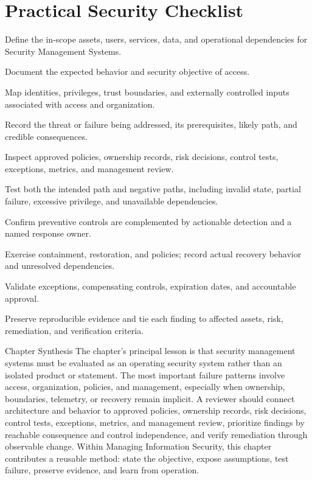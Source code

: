 \documentclass[11pt,letterpaper]{article}
\begin{document}
\section*{Practical Security Checklist}
\begin{CornellChecklist}
\item Define the in-scope assets, users, services, data, and operational dependencies for Security Management Systems.
\item Document the expected behavior and security objective of access.
\item Map identities, privileges, trust boundaries, and externally controlled inputs associated with access and organization.
\item Record the threat or failure being addressed, its prerequisites, likely path, and credible consequences.
\item Inspect approved policies, ownership records, risk decisions, control tests, exceptions, metrics, and management review.
\item Test both the intended path and negative paths, including invalid state, partial failure, excessive privilege, and unavailable dependencies.
\item Confirm preventive controls are complemented by actionable detection and a named response owner.
\item Exercise containment, restoration, and policies; record actual recovery behavior and unresolved dependencies.
\item Validate exceptions, compensating controls, expiration dates, and accountable approval.
\item Preserve reproducible evidence and tie each finding to affected assets, risk, remediation, and verification criteria.
\end{CornellChecklist}
\begin{CornellSummaryBox}{Chapter Synthesis}
The chapter's principal lesson is that security management systems must be evaluated as an operating security system rather than an isolated product or statement. The most important failure patterns involve access, organization, policies, and management, especially when ownership, boundaries, telemetry, or recovery remain implicit. A reviewer should connect architecture and behavior to approved policies, ownership records, risk decisions, control tests, exceptions, metrics, and management review, prioritize findings by reachable consequence and control independence, and verify remediation through observable change. Within Managing Information Security, this chapter contributes a reusable method: state the objective, expose assumptions, test failure, preserve evidence, and learn from operation.
\end{CornellSummaryBox}
\end{document}
